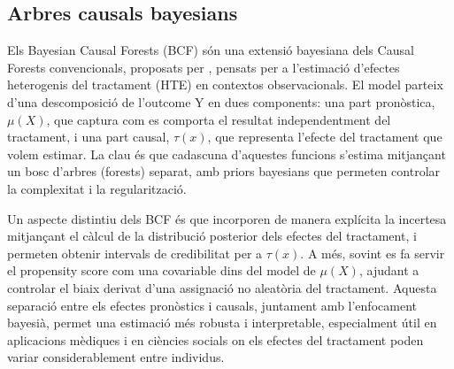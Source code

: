 \documentclass[../main.tex]{subfiles}
\begin{document}
    \subsection{Arbres causals bayesians} \label{subsec:BCF}
    Els Bayesian Causal Forests (BCF) són una extensió bayesiana dels Causal Forests convencionals, proposats per \cite{hahn2020BCT}, pensats per a l’estimació d’efectes heterogenis del tractament (HTE) en contextos observacionals. El model parteix d’una descomposició de l’outcome Y en dues components: una part pronòstica, $\mu(X)$, que captura com es comporta el resultat independentment del tractament, i una part causal, $\tau(x)$, que representa l’efecte del tractament que volem estimar. La clau és que cadascuna d’aquestes funcions s’estima mitjançant un bosc d’arbres (forests) separat, amb priors bayesians que permeten controlar la complexitat i la regularització.\par
    Un aspecte distintiu dels BCF és que incorporen de manera explícita la incertesa mitjançant el càlcul de la distribució posterior dels efectes del tractament, i permeten obtenir intervals de credibilitat per a $\tau(x)$. A més, sovint es fa servir el propensity score com una covariable dins del model de $\mu(X)$, ajudant a controlar el biaix derivat d’una assignació no aleatòria del tractament. Aquesta separació entre els efectes pronòstics i causals, juntament amb l’enfocament bayesià, permet una estimació més robusta i interpretable, especialment útil en aplicacions mèdiques i en ciències socials on els efectes del tractament poden variar considerablement entre individus.
    
    
\end{document}
